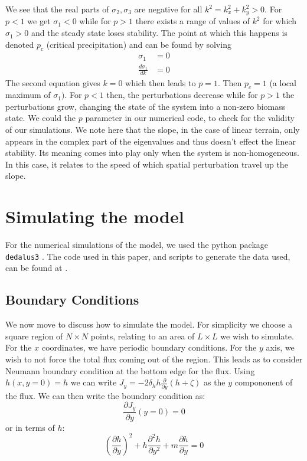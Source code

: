 \documentclass{article}
\numberwithin{equation}{section}
\begin{document}
We see that the real parts of $\sigma_2,\sigma_3$ are negative for all $k^2 = k_x^2+k_y^2>0$. For $p<1$ we get $\sigma_1<0$  while for $p>1$  there exists a range of values of $k^2$  for which $\sigma_1>0$ and the steady state loses stability. The point at which this happens is denoted $p_c$ (critical precipitation) and can be found by solving
\begin{align}
    \sigma_1             & = 0  \\
    \frac{d\sigma_1}{dk} & =  0
\end{align}
The second equation gives $k=0$ which then leads to $p=1$. Then $p_c=1$ (a local maximum of $\sigma_1)$. For $p<1$ then, the perturbations decrease while for $p>1$ the perturbations grow, changing the state of the system into a non-zero biomass state. We could the $p$ parameter in our numerical code, to check for the validity of our simulations.
We note here that the slope, in the case of linear terrain, only appears in the complex part of the eigenvalues and thus doesn't effect the linear stability. Its meaning comes into play only when the system is non-homogeneous. In this case, it relates to the speed of which spatial perturbation travel up the slope.
\section{Simulating the model}

For the numerical simulations of the model, we used the python package \texttt{dedalus3} \parencite[]{dedalus2020}. The code used in this paper, and scripts to generate the data used, can be found at \cite{Ohad_Relation_Between_Biomass_2023}.

\subsection{Boundary Conditions}
We now move to discuss how to simulate the model. For simplicity we choose a square region of $N\times N$ points, relating to an area of  $L\times L$  we wish to simulate. For the $x$ coordinates, we have periodic boundary conditions. For the $y$ axis, we wish to not force the total flux coming out of the region. This leads as to consider Neumann boundary condition at the bottom edge for the flux. Using $h(x,y=0)=h$ we can write $J_y=-2\delta_h h \frac{\partial}{\partial y}(h+\zeta)$ as the $y$ compononent of the flux. We can then write the boundary condition as:
\begin{equation}
    \frac{\partial J_y}{\partial y}(y=0) = 0
\end{equation}
or in terms of $h$:
\begin{equation}
    \left(\frac{\partial h}{\partial y}\right)^2 + h \frac{\partial^2 h}{\partial y^2} + m \frac{\partial h}{\partial y} = 0
\end{equation}
\end{document}
